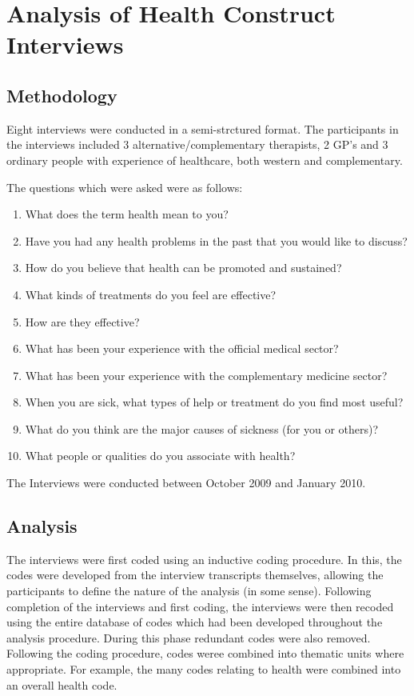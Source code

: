 
\section{Analysis of Health Construct Interviews}

\subsection{Methodology}

Eight interviews were conducted in a semi-strctured format. The participants in the interviews included 3 alternative/complementary therapists, 2 GP's and 3 ordinary people with experience of healthcare, both western and complementary.

The questions which were asked were as follows:
\begin{enumerate}
\item What does the term health mean to you? 
\item Have you had any health problems in the past that you would like to discuss?
\item How do you believe that health can be promoted and sustained?
\item What kinds of treatments do you feel are effective? 
\item How are they effective?
\item What has been your experience with the official medical sector?
\item What has been your experience with the complementary medicine sector?
\item When you are sick, what types of help or treatment do you find most useful?
\item What do you think are the major causes of sickness (for you or others)?
\item What people or qualities do you associate with health?
\end{enumerate}


The Interviews were conducted between October 2009 and January 2010. 

\subsection{Analysis}

The interviews were first coded using an inductive coding procedure. In this, the codes were developed from the interview transcripts themselves, allowing the participants to define the nature of the analysis (in some sense). Following completion of the interviews and first coding, the interviews were then recoded using the entire database of codes which had been developed throughout the analysis procedure.
During this phase redundant codes were also removed. Following the coding procedure, codes weree combined into thematic units where appropriate. For example, the many codes relating to health were combined into an overall health code.

